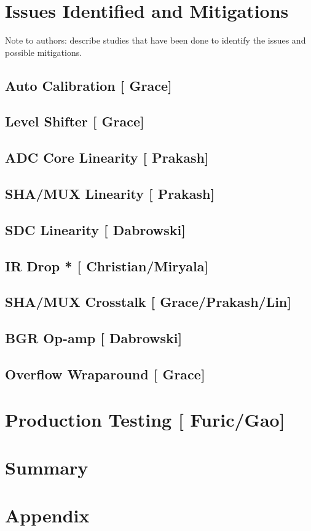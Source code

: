 \documentclass[10pt]{article}
\begin{document}
\section{Issues Identified and Mitigations}
Note to authors: describe studies that have been done to identify the issues and possible mitigations.

\subsection{Auto Calibration [{\color{red} Grace}] }
\subsection{Level Shifter  [{\color{red} Grace}] }
\subsection{ADC Core Linearity  [{\color{red} Prakash}] }
\subsection{SHA/MUX Linearity  [{\color{red} Prakash}] }
\subsection{SDC Linearity  [{\color{red} Dabrowski}] }

\subsection{IR Drop * [{\color{red} Christian/Miryala}] }
\subsection{SHA/MUX Crosstalk [{\color{red} Grace/Prakash/Lin}] }
\subsection{BGR Op-amp	 [{\color{red} Dabrowski}] }

\subsection{Overflow Wraparound  [{\color{red} Grace}] }


\section{Production Testing   [{\color{red} Furic/Gao}] }


\section{Summary}  
%	

\newpage



\newpage
\section*{Appendix}

\end{document}

